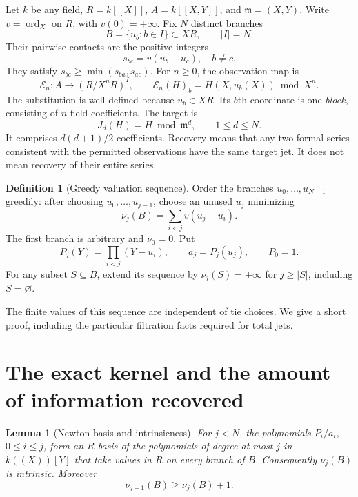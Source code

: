 \documentclass[11pt]{article}
\newtheorem{lemma}[theorem]{Lemma}
\theoremstyle{definition}
\newtheorem{definition}[theorem]{Definition}
\newcommand{\m}{\mathfrak m}
\newcommand{\ord}{\operatorname{ord}}
\newcommand{\E}{\mathcal E}
\begin{document}
Let $k$ be any field, $R=k[[X]]$, $A=k[[X,Y]]$, and $\m=(X,Y)$. Write $v=\ord_X$ on $R$, with $v(0)=+\infty$. Fix $N$ distinct branches
\[
 B=\{u_b:b\in I\}\subset XR,\qquad |I|=N.
\]
Their pairwise contacts are the positive integers
\begin{equation}\label{eq:contacts}
 s_{bc}=v(u_b-u_c),\quad b\ne c.
\end{equation}
They satisfy $s_{bc}\ge\min(s_{ba},s_{ac})$. For $n\ge0$, the observation map is
\[
 \E_n:A\longrightarrow (R/X^nR)^I,\qquad
 \E_n(H)_b=H(X,u_b(X))\bmod X^n.
\]
The substitution is well defined because $u_b\in XR$. Its $b$th coordinate is one \emph{block}, consisting of $n$ field coefficients. The target is
\[
 J_d(H)=H\bmod\m^d,\qquad 1\le d\le N.
\]
It comprises $d(d+1)/2$ coefficients. Recovery means that any two formal series consistent with the permitted observations have the same target jet. It does not mean recovery of their entire series.

\begin{definition}[Greedy valuation sequence]\label{def:greedy}
Order the branches $u_0,\ldots,u_{N-1}$ greedily: after choosing $u_0,\ldots,u_{j-1}$, choose an unused $u_j$ minimizing
\[
 \nu_j(B)=\sum_{i<j}v(u_j-u_i).
\]
The first branch is arbitrary and $\nu_0=0$. Put
\[
 P_j(Y)=\prod_{i<j}(Y-u_i),\qquad a_j=P_j(u_j),\qquad P_0=1.
\]
For any subset $S\subseteq B$, extend its sequence by $\nu_j(S)=+\infty$ for $j\ge |S|$, including $S=\varnothing$.
\end{definition}

The finite values of this sequence are independent of tie choices. We give a short proof, including the particular filtration facts required for total jets.

\section{The exact kernel and the amount of information recovered}\label{sec:kernel}

\begin{lemma}[Newton basis and intrinsicness]\label{lem:newton}
For $j<N$, the polynomials $P_i/a_i$, $0\le i\le j$, form an $R$-basis of the polynomials of degree at most $j$ in $k((X))[Y]$ that take values in $R$ on every branch of $B$. Consequently $\nu_j(B)$ is intrinsic. Moreover
\begin{equation}\label{eq:growth}
 \nu_{j+1}(B)\ge\nu_j(B)+1.
\end{equation}
\end{lemma}
\end{document}
